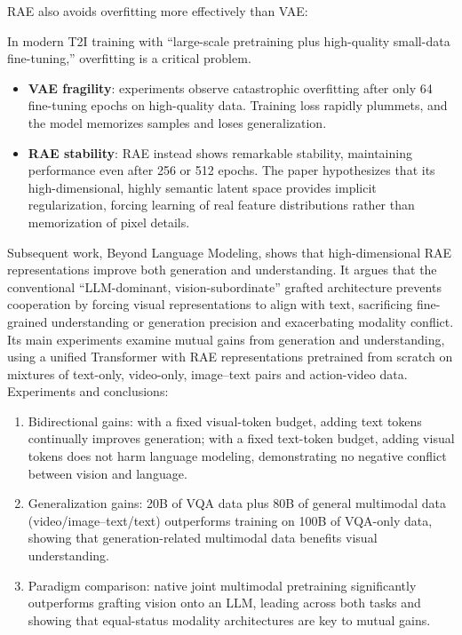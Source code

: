 RAE also avoids overfitting more effectively than VAE:

In modern T2I training with ``large-scale pretraining plus high-quality small-data fine-tuning,'' overfitting is a critical problem.

\begin{itemize}
\tightlist
\item
  \textbf{VAE fragility}: experiments observe catastrophic overfitting after only 64 fine-tuning epochs on high-quality data. Training loss rapidly plummets, and the model memorizes samples and loses generalization.
\item
  \textbf{RAE stability}: RAE instead shows remarkable stability, maintaining performance even after 256 or 512 epochs. The paper hypothesizes that its high-dimensional, highly semantic latent space provides implicit regularization, forcing learning of real feature distributions rather than memorization of pixel details.
\end{itemize}

Subsequent work, Beyond Language Modeling, shows that high-dimensional RAE representations improve both generation and understanding. It argues that the conventional ``LLM-dominant, vision-subordinate'' grafted architecture prevents cooperation by forcing visual representations to align with text, sacrificing fine-grained understanding or generation precision and exacerbating modality conflict. Its main experiments examine mutual gains from generation and understanding, using a unified Transformer with RAE representations pretrained from scratch on mixtures of text-only, video-only, image--text pairs and action-video data. Experiments and conclusions:

\begin{enumerate}
\def\labelenumi{\arabic{enumi}.}
\tightlist
\item
  Bidirectional gains: with a fixed visual-token budget, adding text tokens continually improves generation; with a fixed text-token budget, adding visual tokens does not harm language modeling, demonstrating no negative conflict between vision and language.
\item
  Generalization gains: 20B of VQA data plus 80B of general multimodal data (video/image--text/text) outperforms training on 100B of VQA-only data, showing that generation-related multimodal data benefits visual understanding.
\item
  Paradigm comparison: native joint multimodal pretraining significantly outperforms grafting vision onto an LLM, leading across both tasks and showing that equal-status modality architectures are key to mutual gains.
\end{enumerate}

